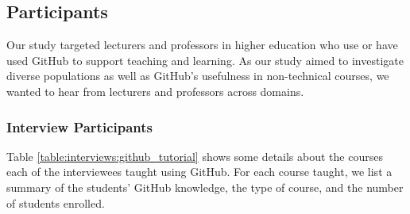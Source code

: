 \subsection{Participants}
Our study targeted lecturers and professors in higher education who use or have used GitHub to support teaching and learning. As our study aimed to investigate diverse populations as well as GitHub's usefulness in non-technical courses, we wanted to hear from lecturers and professors across domains.

\subsubsection{Interview Participants}
Table \ref{table:interviews:github_tutorial} shows some details about the courses each of the interviewees taught using GitHub. For each course taught, we list a summary of the students' GitHub knowledge, the type of course, and the number of students enrolled.

